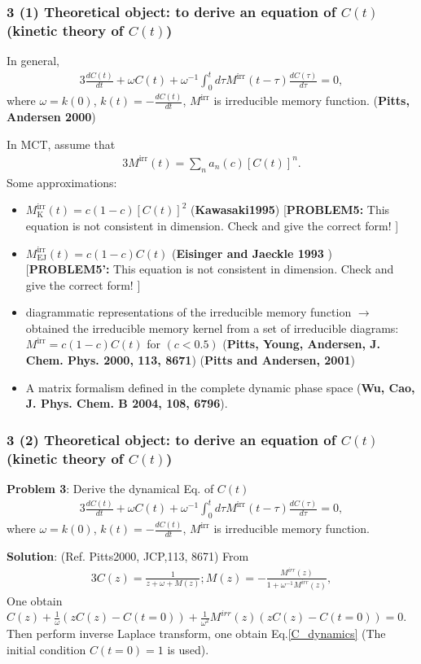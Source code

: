 \documentclass[8pt]{beamer}
\begin{document}
\begin{frame}
	\frametitle{3 (1) Theoretical object: to derive an equation of $C(t)$ (kinetic theory of $C(t)$)}
	In general,
	\begin{alignat}{3}
		\frac{dC(t)}{dt} + \omega C(t) + \omega^{-1} \int_0^t d\tau M^\text{irr}(t-\tau) \frac{dC(\tau)}{d\tau} = 0,
	\end{alignat}
where $\omega = k(0)$, $k(t) = -\frac{dC(t)}{dt}$, $M^\text{irr}$ is irreducible memory function.  (\textbf{Pitts, Andersen 2000})

In MCT, assume that
\begin{alignat}{3}
M^\text{irr}(t)=\sum_n a_n(c) [C(t)]^n. 
\end{alignat}
Some approximations:
\begin{itemize}
	\item  $M^\text{irr}_\text{K}(t) = c(1-c) [C(t)]^2$ (\textbf{Kawasaki1995}) [\textbf{PROBLEM5:} This equation is not consistent in dimension. Check and give the correct form! ] 
	\item  $M^\text{irr}_\text{EJ}(t) = c(1-c) C(t) $ (\textbf{Eisinger and Jaeckle 1993} ) [\textbf{PROBLEM5':} This equation is not consistent in dimension. Check and give the correct form! ] 
	\item diagrammatic representations of the irreducible memory function $\to$ obtained the irreducible memory kernel from a set of irreducible diagrams: $M^\text{irr} = c(1-c) C(t)$ for $(c< 0.5)$ (\textbf{Pitts, Young, Andersen, J. Chem. Phys. 2000, 113, 8671})
	 (\textbf{Pitts and Andersen, 2001})
	 \item A matrix formalism defined in the complete dynamic phase space (\textbf{Wu, Cao, J. Phys. Chem. B 2004, 108, 6796}).%
\end{itemize}	
\end{frame}

\begin{frame}
	\frametitle{3 (2) Theoretical object: to derive an equation of $C(t)$ (kinetic theory of $C(t)$)}
	{\textbf{Problem 3}}: Derive the dynamical Eq. of $C(t)$
	\begin{alignat}{3}
		\frac{dC(t)}{dt} + \omega C(t) + \omega^{-1} \int_0^t d\tau M^\text{irr}(t-\tau) \frac{dC(\tau)}{d\tau} = 0,
		\label{C_dynamics}
	\end{alignat}
	where $\omega = k(0)$, $k(t) = -\frac{dC(t)}{dt}$, $M^\text{irr}$ is irreducible memory function. 
	
	{\textbf{Solution}}:  (Ref. Pitts2000, JCP,113, 8671) From
	\begin{alignat}{3}
		C(z) = \frac{1}{ z+ \omega + M(z)}; M(z) = - \frac{M^{irr}(z)} {1 + \omega^{-1}M^{irr}(z)},
		\label{C_z}
	\end{alignat}
	One obtain $C(z) + \frac{1}{\omega} (zC(z)-C(t=0)) + \frac{1}{\omega^2}M^{irr}(z)(zC(z)-C(t=0)) = 0$. 
	Then perform inverse Laplace transform, one obtain Eq.\ref{C_dynamics} (The initial condition $C(t=0) = 1$ is used).
\end{frame}
\end{document}
